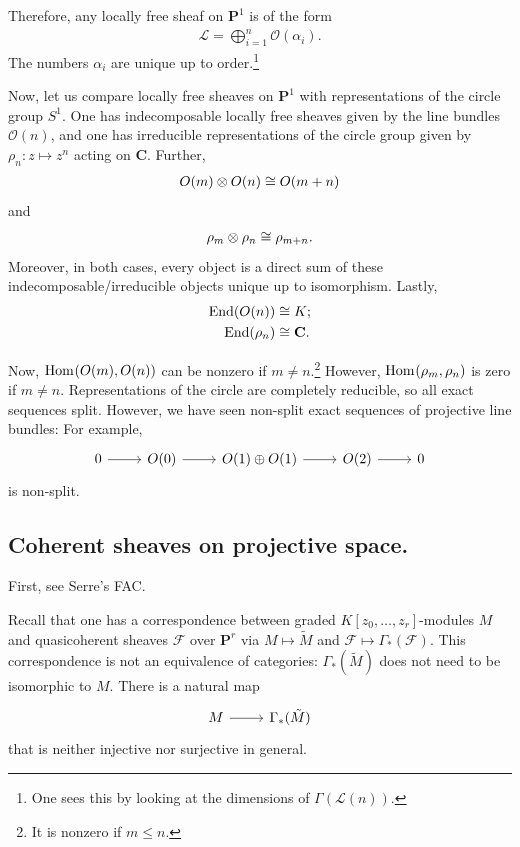 \documentclass [11 pt, oneside] {article}
\begin{document}
Therefore, any locally free sheaf on $\mathbf{P}^1$ is of the form
\begin{align*}
	\mathscr{L}= \bigoplus_{i=1}^n \mathscr{O}(\alpha_i).
\end{align*}
The numbers $\alpha_i$ are unique up to order.\footnote{One sees this by looking at the dimensions of $\Gamma(\mathscr{L}(n))$.}

Now, let us compare locally free sheaves on $\mathbf{P}^1$ with representations of the circle group $S^1$. One has indecomposable locally free sheaves given by the line bundles $\mathscr{O}(n)$, and one has irreducible representations of the circle group given by $\rho_n : z\longmapsto z^n$ acting on $\mathbf{C}$. Further,
\begin{align*}
	\relax{O}(m)\otimes  \relax{O}(n) \cong  \relax{O}(m+n)
\end{align*}
and
\begin{align*}
	\rho_m \otimes \rho_n \cong \rho_{m+n}.
\end{align*}
Moreover, in both cases, every object is a direct sum of these indecomposable/irreducible objects unique up to isomorphism. Lastly,
\begin{align*}
	\operatorname{End}(\relax{O}(n)) &\cong K;\\
	\operatorname{End}(\rho_n) &\cong  \mathbf{C}.
\end{align*}

Now, $\operatorname{Hom}_{}(\relax{O}(m), \relax{O}(n))$ can be nonzero if $m\ne n$.\footnote{It is nonzero if $m\le n$.} However, $\operatorname{Hom}_{}(\rho_m, \rho_n)$ is zero if $m\ne n$.
Representations of the circle are completely reducible, so all exact sequences split. However, we have seen non-split exact sequences of projective line bundles: For example,
\[
\begin{tikzcd}
	0\ar[r] & \mathscr{O}(0)\ar[r] & \mathscr{O}(1) \oplus \mathscr{O}(1)\ar[r] & \mathscr{O}(2)\ar[r]&0
\end{tikzcd}
\]
is non-split.

\subsection{Coherent sheaves on projective space.}
First, see Serre's FAC. 

Recall that one has a correspondence between graded $K[z_0,\hdots,z_r]$-modules $M$ and quasicoherent sheaves $\mathscr{F}$ over $\mathbf{P}^r$ via $M\longmapsto \tilde M$ and $\mathscr{F}\longmapsto \Gamma_*(\mathscr{F})$. This correspondence is not an equivalence of categories: $\Gamma_*(\tilde M)$ does not need to be isomorphic to $M$. There is a natural map
\[
\begin{tikzcd}
M\ar[r]& \Gamma_*(\tilde M)
\end{tikzcd}
\]
that is neither injective nor surjective in general. 
\end{document}
